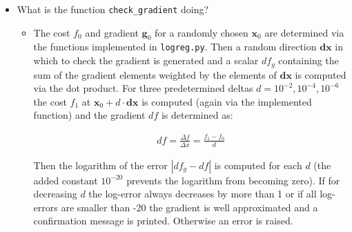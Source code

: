 \documentclass{article}
\begin{document}
\begin{itemize}
\item What is the function \texttt{check\_gradient} doing?
\begin{itemize}
\item The cost $f_0$ and gradient $\boldsymbol{g}_0$ for a randomly chosen $\boldsymbol{x}_0$ are determined via the functions implemented in \texttt{logreg.py}. Then a random direction $\boldsymbol{dx}$ in which to check the gradient is generated and a scalar $df_g$ containing the sum of the gradient elements weighted by the elements of $\boldsymbol{dx}$ is computed via the dot product. For three predetermined deltas $d=10^{-2},10^{-4},10^{-6}$  the cost $f_1$ at $\boldsymbol{x}_0+d\cdot \boldsymbol{dx}$ is computed (again via the implemented function) and the gradient $df$ is determined as:

\begin{align*}
df = \frac{\Delta f}{\Delta x} = \frac{f_1-f_0}{d}
\end{align*}

Then the logarithm of the error $|df_g - df|$ is computed for each $d$ (the added constant $10^{-20}$ prevents the logarithm from becoming zero). If for decreasing $d$ the log-error always decreases by more than 1 or if all log-errors are smaller than -20 the gradient is well approximated and a confirmation message is printed. Otherwise an error is raised.
\end{itemize}


\end{itemize}
\end{document}
